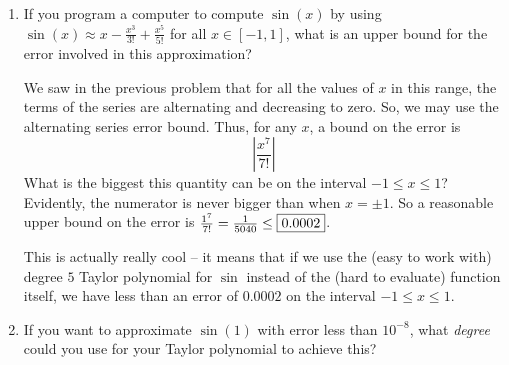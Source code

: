 \documentclass[main]{subfiles}
\begin{document}
\begin{enumerate}
\begin{enumerate}
\begin{solution}
If $0<x<1$, the Taylor series will alternate in sign, with the first term being positive. And if $-1<x<0$, the Taylor series will also alternate in sign, but with the first term being negative. Thus, for all values of $x$, the Taylor series is an alternating series! Also, for all $x$ in $[-1,1]$, it is evident that the size of the terms $\displaystyle \left|\frac{(-1)^k\cdot x^{2k+1}}{(2k+1)!}\right|$ will decrease towards 0, since the numerator will not increase in size as $k\to\infty$, while the denominator will increase (quickly) to $\infty$ as $k\to\infty$. Thus, by the Alternating Series Test, the Taylor series for $\sin x$ converges for all $x$ in $[-1,1]$.
\end{solution}
\pspace{\newpage}
\item
\begin{problem}[\vfill] If you program a computer to compute $\sin(x)$ by using $\displaystyle \sin(x) \approx x - \frac{x^3}{3!} +  \frac{x^5}{5!}$ for all $x \in [-1, 1]$, what is an upper bound for the error involved in this approximation?
\end{problem}

\begin{solution}
We saw in the previous problem that for all the values of $x$ in this range, the terms of the series are alternating and decreasing to zero. So, we may use the alternating series error bound.  Thus, for any $x$, a bound on the error is 
\[  \left| \frac{x^7}{7!} \right| \]
What is the biggest this quantity can be on the interval $-1\leq x\leq 1$?  Evidently, the numerator is never bigger than when $x = \pm1$.  So a reasonable upper bound on the error is $\frac{1^7}{7!} =\frac{1}{5040}\leq \fbox{0.0002}$.  

This is actually really cool -- it means that if we use the  (easy to work with) degree $5$ Taylor polynomial for $\sin$ instead of the (hard to evaluate) function itself, we have less than an error of $0.0002$ on the interval $-1\leq x\leq 1$.
\end{solution}

\item 
\begin{problem}[\vfill]
If you want to approximate $\sin(1)$ with error less than $10^{-8}$, what \textit{degree} could you use for your Taylor polynomial to achieve this? 
\end{problem}


\end{enumerate}
\end{enumerate}
\end{document}
